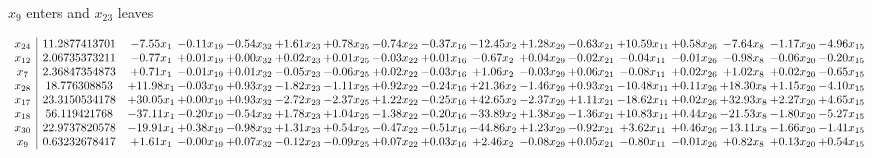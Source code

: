 \documentclass[9pt]{article}
\begin{document}
 $ x_{9} $ enters and $ x_{23} $ leaves 

 \[\begin{array}{c| c c@{\hskip 2pt} c@{\hskip 2pt} c@{\hskip 2pt} c@{\hskip 2pt} c@{\hskip 2pt} c@{\hskip 2pt} c@{\hskip 2pt} c@{\hskip 2pt} c@{\hskip 2pt} c@{\hskip 2pt} c@{\hskip 2pt} c@{\hskip 2pt} c@{\hskip 2pt} c@{\hskip 2pt} c@{\hskip 2pt} }
 x_{24}   &  11.2877413701 & -7.55 x_{1} & -0.11 x_{19} & -0.54 x_{32} & +  1.61 x_{23} & +  0.78 x_{25} & -0.74 x_{22} & -0.37 x_{16} & -12.45 x_{2} & +  1.28 x_{29} & -0.63 x_{21} & + 10.59 x_{11} & +  0.58 x_{26} & -7.64 x_{8} & -1.17 x_{20} & -4.96 x_{15}\\
 x_{12}   &  2.06735373211 & -0.77 x_{1} & +  0.01 x_{19} & +  0.00 x_{32} & +  0.02 x_{23} & +  0.01 x_{25} & -0.03 x_{22} & +  0.01 x_{16} & -0.67 x_{2} & +  0.04 x_{29} & -0.02 x_{21} & -0.04 x_{11} & -0.01 x_{26} & -0.98 x_{8} & -0.06 x_{20} & -0.20 x_{15}\\
 x_{7}   &  2.36847354873 & +  0.71 x_{1} & -0.01 x_{19} & +  0.01 x_{32} & -0.05 x_{23} & -0.06 x_{25} & +  0.02 x_{22} & -0.03 x_{16} & +  1.06 x_{2} & -0.03 x_{29} & +  0.06 x_{21} & -0.08 x_{11} & +  0.02 x_{26} & +  1.02 x_{8} & +  0.02 x_{20} & -0.65 x_{15}\\
 x_{28}   &  18.776308853 & + 11.98 x_{1} & -0.03 x_{19} & +  0.93 x_{32} & -1.82 x_{23} & -1.11 x_{25} & +  0.92 x_{22} & -0.24 x_{16} & + 21.36 x_{2} & -1.46 x_{29} & +  0.93 x_{21} & -10.48 x_{11} & +  0.11 x_{26} & + 18.30 x_{8} & +  1.15 x_{20} & -4.10 x_{15}\\
 x_{17}   &  23.3150534178 & + 30.05 x_{1} & +  0.00 x_{19} & +  0.93 x_{32} & -2.72 x_{23} & -2.37 x_{25} & +  1.22 x_{22} & -0.25 x_{16} & + 42.65 x_{2} & -2.37 x_{29} & +  1.11 x_{21} & -18.62 x_{11} & +  0.02 x_{26} & + 32.93 x_{8} & +  2.27 x_{20} & +  4.65 x_{15}\\
 x_{18}   &  56.119421768 & -37.11 x_{1} & -0.20 x_{19} & -0.54 x_{32} & +  1.78 x_{23} & +  1.04 x_{25} & -1.38 x_{22} & -0.20 x_{16} & -33.89 x_{2} & +  1.38 x_{29} & -1.36 x_{21} & + 10.83 x_{11} & +  0.44 x_{26} & -21.53 x_{8} & -1.80 x_{20} & -5.27 x_{15}\\
 x_{30}   &  22.9737820578 & -19.91 x_{1} & +  0.38 x_{19} & -0.98 x_{32} & +  1.31 x_{23} & +  0.54 x_{25} & -0.47 x_{22} & -0.51 x_{16} & -44.86 x_{2} & +  1.23 x_{29} & -0.92 x_{21} & +  3.62 x_{11} & +  0.46 x_{26} & -13.11 x_{8} & -1.66 x_{20} & -1.41 x_{15}\\
 x_{9}   &  0.63232678417 & +  1.61 x_{1} & -0.00 x_{19} & +  0.07 x_{32} & -0.12 x_{23} & -0.09 x_{25} & +  0.07 x_{22} & +  0.03 x_{16} & +  2.46 x_{2} & -0.08 x_{29} & +  0.05 x_{21} & -0.80 x_{11} & -0.01 x_{26} & +  0.82 x_{8} & +  0.13 x_{20} & +  0.54 x_{15}\\

\end{array}\]
\end{document}
